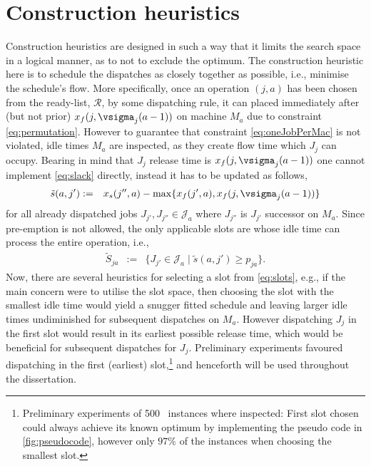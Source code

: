 \section{Construction heuristics}\label{sec:CH}
Construction heuristics are designed in such a way that it limits the search space in a logical manner, as to not to exclude the optimum. The construction heuristic here is to schedule the dispatches as closely together as possible, i.e., minimise the schedule's flow. 
More specifically, once an operation $(j,a)$ has been chosen from the ready-list, $\mathcal{R}$, by some dispatching rule, it can placed immediately after (but not prior) $x_f(j,\vsigma_j(a-1))$ on machine $M_a$ due to constraint \cref{eq:permutation}. 
However to guarantee that constraint \cref{eq:oneJobPerMac} is not violated, idle times $M_a$ are inspected, as they create flow time  which $J_j$ can occupy. Bearing in mind that $J_j$ release time is $x_f(j,\vsigma_j(a-1))$ one cannot implement \cref{eq:slack} directly, instead it has to be updated as follows,
\begin{eqnarray}
\tilde{s}(a,j')&:=& x_s(j'',a)-\max\{x_f(j',a),x_f(j,\vsigma_j(a-1))\} %
\end{eqnarray}
for all already dispatched jobs $J_{j'},J_{j''}\in \mathcal{J}_a$ where $J_{j''}$ is $J_{j'}$ successor on $M_a$. Since pre-emption is not allowed, the only applicable slots are whose idle time can process the entire operation, i.e.,
\begin{eqnarray}
\tilde{S}_{ja}&:=&\{J_{j'}\in \mathcal{J}_a\;|\;\tilde{s}(a,j')\geq p_{ja} \}\label{eq:slots}.
\end{eqnarray} 
Now, there are several heuristics for selecting a slot from \cref{eq:slots}, e.g., if the main concern were to utilise the slot space, then choosing the slot with the smallest idle time would yield a snugger fitted schedule and leaving larger idle times undiminished for subsequent dispatches on $M_a$. However dispatching $J_j$ in the first slot would result in its earliest possible release time, which would be beneficial for subsequent dispatches for $J_j$. Preliminary experiments favoured dispatching in the first (earliest) slot,\footnote{Preliminary experiments of 500 \JSP\ instances where inspected: First slot chosen could always achieve its known optimum by implementing the pseudo code in \cref{fig:pseudocode}, however only $97\%$ of the instances when choosing the smallest slot.} and henceforth will be used throughout the dissertation.

